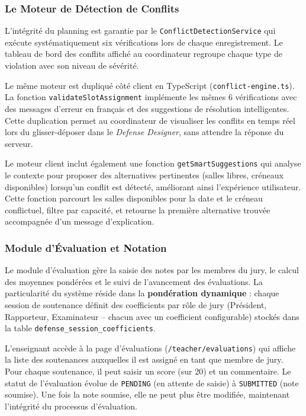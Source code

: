 \subsubsection{Le Moteur de Détection de Conflits}
\label{ch4:module_conflicts}

L'intégrité du planning est garantie par le \texttt{ConflictDetectionService} qui exécute systématiquement six vérifications lors de chaque enregistrement. Le tableau de bord des conflits affiché au coordinateur regroupe chaque type de violation avec son niveau de sévérité.

Le même moteur est dupliqué côté client en TypeScript (\texttt{conflict-engine.ts}). La fonction \texttt{validateSlotAssignment} implémente les mêmes 6 vérifications avec des messages d'erreur en français et des suggestions de résolution intelligentes. Cette duplication permet au coordinateur de visualiser les conflits en temps réel lors du glisser-déposer dans le \textit{Defense Designer}, sans attendre la réponse du serveur.

Le moteur client inclut également une fonction \texttt{getSmartSuggestions} qui analyse le contexte pour proposer des alternatives pertinentes (salles libres, créneaux disponibles) lorsqu'un conflit est détecté, améliorant ainsi l'expérience utilisateur. Cette fonction parcourt les salles disponibles pour la date et le créneau conflictuel, filtre par capacité, et retourne la première alternative trouvée accompagnée d'un message d'explication.

\subsubsection{Module d'Évaluation et Notation}
\label{ch4:module_evaluation}

Le module d'évaluation gère la saisie des notes par les membres du jury, le calcul des moyennes pondérées et le suivi de l'avancement des évaluations. La particularité du système réside dans la \textbf{pondération dynamique} : chaque session de soutenance définit des coefficients par rôle de jury (Président, Rapporteur, Examinateur -- chacun avec un coefficient configurable) stockés dans la table \texttt{defense\_session\_coefficients}.

L'enseignant accède à la page d'évaluations (\texttt{/teacher/evaluations}) qui affiche la liste des soutenances auxquelles il est assigné en tant que membre de jury. Pour chaque soutenance, il peut saisir un score (sur 20) et un commentaire. Le statut de l'évaluation évolue de \texttt{PENDING} (en attente de saisie) à \texttt{SUBMITTED} (note soumise). Une fois la note soumise, elle ne peut plus être modifiée, maintenant l'intégrité du processus d'évaluation.

